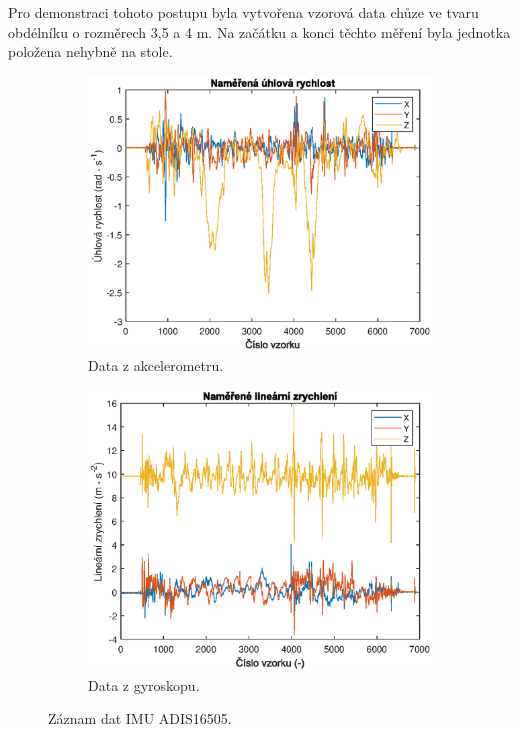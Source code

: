 Pro demonstraci tohoto postupu byla vytvořena vzorová data chůze ve tvaru obdélníku o rozměrech 3,5 a 4 m. Na začátku a konci těchto měření byla jednotka položena nehybně na stole.

\begin{figure}[h]
     \centering
     \begin{subfigure}[b]{0.49\textwidth}
         \centering
         \includegraphics[width=\textwidth]{obrazky/matlab/1measAngularVel}
         \caption{Data z akcelerometru.}     
     \end{subfigure}
     \hfill
     \centering
     \begin{subfigure}[b]{0.49\textwidth}
         \centering
         \includegraphics[width=\textwidth]{obrazky/matlab/1measAccel}
         \caption{Data z gyroskopu.}   
     \end{subfigure}

        \caption{Záznam dat IMU ADIS16505.}
        \label{fig:IMURawData}
\end{figure}

